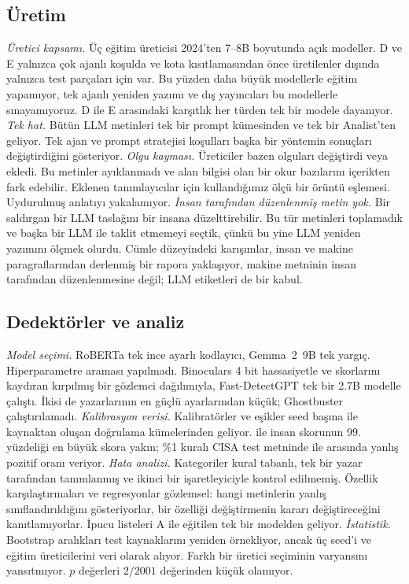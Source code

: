 \documentclass[journal]{IEEEtran}
\begin{document}
\subsection{Üretim}
\emph{Üretici kapsamı.} Üç eğitim üreticisi 2024'ten 7--8B boyutunda açık modeller. D ve E yalnızca çok ajanlı
koşulda ve kota kısıtlamasından önce üretilenler dışında yalnızca test parçaları için var. Bu yüzden daha büyük
modellerle eğitim yapamıyor, tek ajanlı yeniden yazımı ve dış yayıncıları bu modellerle sınayamıyoruz. D ile E
arasındaki karşıtlık her türden tek bir modele dayanıyor. \emph{Tek hat.} Bütün LLM metinleri tek bir prompt
kümesinden ve tek bir Analist'ten geliyor. Tek ajan ve prompt stratejisi koşulları başka bir yöntemin sonuçları
değiştirdiğini gösteriyor. \emph{Olgu kayması.} Üreticiler bazen olguları değiştirdi veya ekledi. Bu metinler
ayıklanmadı ve alan bilgisi olan bir okur bazılarını içerikten fark edebilir. Eklenen tanımlayıcılar için
kullandığımız ölçü bir örüntü eşlemesi. Uydurulmuş anlatıyı yakalamıyor. \emph{İnsan tarafından düzenlenmiş metin
yok.} Bir saldırgan bir LLM taslağını bir insana düzelttirebilir. Bu tür metinleri toplamadık ve başka bir LLM ile
taklit etmemeyi seçtik, çünkü bu yine LLM yeniden yazımını ölçmek olurdu. Cümle düzeyindeki karışımlar, insan ve
makine paragraflarından derlenmiş bir rapora yaklaşıyor, makine metninin insan tarafından düzenlenmesine değil;
LLM etiketleri de bir kabul.

\subsection{Dedektörler ve analiz}
\emph{Model seçimi.} RoBERTa tek ince ayarlı kodlayıcı, Gemma~2~9B tek yargıç. Hiperparametre araması yapılmadı.
Binoculars 4 bit hassasiyetle ve skorlarını kaydıran kırpılmış bir gözlemci dağılımıyla, Fast-DetectGPT tek bir
2.7B modelle çalıştı. İkisi de yazarlarının en güçlü ayarlarından küçük; Ghostbuster çalıştırılamadı.
\emph{Kalibrasyon verisi.} Kalibratörler ve eşikler seed başına \LeakValMin{} ile \LeakValMax{} kaynaktan oluşan doğrulama
kümelerinden geliyor. \LeakValHumanMin{} ile \LeakValHumanMax{} insan skorunun 99. yüzdeliği en
büyük skora yakın; \%1 kuralı CISA test metninde
\ThrInLexlrHumoneFpr{} ile \ThrInTransHumoneFpr{} arasında yanlış pozitif oranı veriyor. \emph{Hata analizi.}
Kategoriler kural tabanlı, tek bir yazar tarafından tanımlanmış ve ikinci bir işaretleyiciyle kontrol edilmemiş.
Özellik karşılaştırmaları ve regresyonlar gözlemsel: hangi metinlerin yanlış sınıflandırıldığını gösteriyorlar,
bir özelliği değiştirmenin kararı değiştireceğini kanıtlamıyorlar. İpucu listeleri A ile eğitilen tek bir modelden
geliyor. \emph{İstatistik.} Bootstrap aralıkları test kaynaklarını yeniden örnekliyor, ancak üç seed'i ve eğitim
üreticilerini veri olarak alıyor. Farklı bir üretici seçiminin varyansını yansıtmıyor. $p$ değerleri $2/2001$
değerinden küçük olamıyor.
\end{document}
